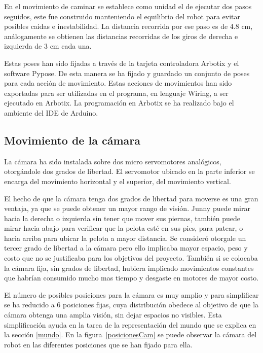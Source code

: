 En el movimiento de caminar se establece como unidad el de ejecutar dos pasos seguidos, este fue construido manteniendo el equilibrio del robot para evitar posibles caidas e inestabilidad. La distancia recorrida por ese paso es de 4.8 cm, análogamente se obtienen las distancias recorridas de los giros de derecha e izquierda de 3 cm cada una. 

Estas poses han sido fijadas a través de la tarjeta controladora Arbotix y el software Pypose. De esta manera se ha fijado y guardado un conjunto de poses para cada acción de movimiento. Estas acciones de movimientos han sido exportadas para ser utilizadas en el programa, en lenguaje Wiring, a ser ejecutado en Arbotix. La programación en Arbotix se ha realizado bajo el ambiente del \gls{IDE} de Arduino. 


\subsection{Movimiento de la cámara}\label{movCamara}
La cámara ha sido instalada sobre dos micro servomotores analógicos, otorgándole dos grados de libertad. El servomotor ubicado en la parte inferior se encarga del movimiento horizontal y el superior, del movimiento vertical.

El hecho de  que la cámara tenga dos grados de libertad para moverse es una gran ventaja, ya que se puede obtener un mayor rango de visión. Junny puede mirar hacia la derecha o izquierda sin tener que mover sus piernas, también puede mirar hacia abajo para verificar que la pelota esté en sus pies, para patear, o hacia arriba para ubicar la pelota a mayor distancia.
 Se consideró otorgale un tercer grado de libertad a la c\'amara pero ello implicaba mayor espacio, peso y costo que no se justificaba para los objetivos del proyecto. Tambi\'en si se colocaba la c\'amara fija, sin grados de libertad, hubiera implicado movimientos constantes que habrían consumido mucho mas tiempo y desgaste en motores de mayor costo.

El número de posibles posiciones para la cámara es muy amplio y para simplificar se ha reducido a 6 posiciones fijas, cuya distribución obedece al objetivo de que la cámara obtenga una amplia visión, sin dejar espacios no visibles. Esta simplificación ayuda en la tarea de la representación del mundo que se explica en la sección \ref{mundo}. En la figura~\ref{posicionesCam} se puede observar la cámara del robot en las diferentes posiciones que se han fijado para ella.

